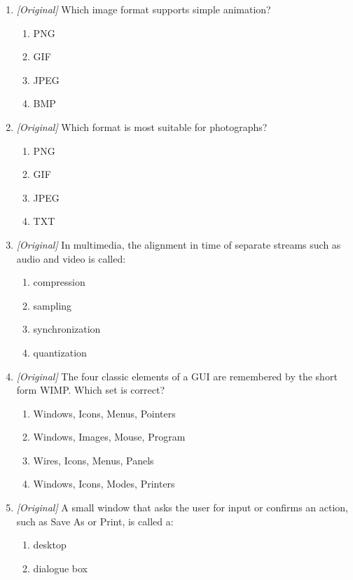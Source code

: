 \begin{enumerate}[label=\textbf{Q\arabic*.}, leftmargin=*]
\begin{enumerate}[label=\Alph*.]
    \item BMP --- a small web format for photographs
  \end{enumerate}
\item \textit{[Original]} Which image format supports simple animation?
  \begin{enumerate}[label=\Alph*.]
    \item PNG
    \item GIF
    \item JPEG
    \item BMP
  \end{enumerate}
\item \textit{[Original]} Which format is most suitable for photographs?
  \begin{enumerate}[label=\Alph*.]
    \item PNG
    \item GIF
    \item JPEG
    \item TXT
  \end{enumerate}
\item \textit{[Original]} In multimedia, the alignment in time of separate
  streams such as audio and video is called:
  \begin{enumerate}[label=\Alph*.]
    \item compression
    \item sampling
    \item synchronization
    \item quantization
  \end{enumerate}
\item \textit{[Original]} The four classic elements of a GUI are remembered by
  the short form WIMP. Which set is correct?
  \begin{enumerate}[label=\Alph*.]
    \item Windows, Icons, Menus, Pointers
    \item Windows, Images, Mouse, Program
    \item Wires, Icons, Menus, Panels
    \item Windows, Icons, Modes, Printers
  \end{enumerate}
\item \textit{[Original]} A small window that asks the user for input or
  confirms an action, such as Save As or Print, is called a:
  \begin{enumerate}[label=\Alph*.]
    \item desktop
    \item dialogue box

\end{enumerate}
\end{enumerate}

